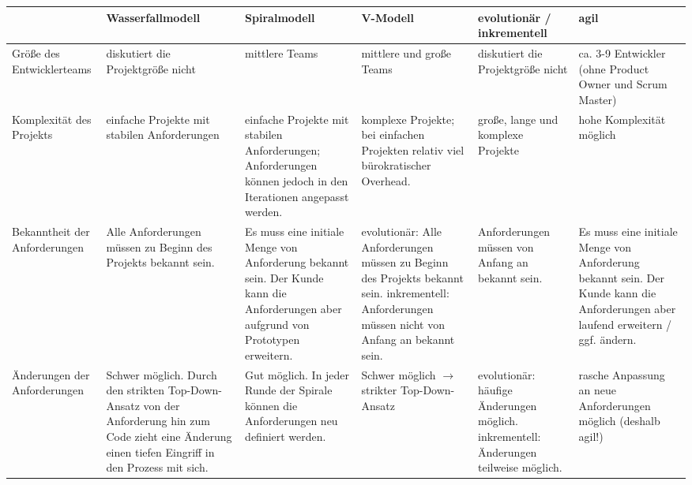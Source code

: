 \documentclass{bschlangaul-aufgabe}
\begin{document}
\begin{liAntwort}
\noindent
{\tiny
\begin{tabularx}{\linewidth}{>{\raggedright\arraybackslash}X||>{\raggedright\arraybackslash}X>{\raggedright\arraybackslash}X>{\raggedright\arraybackslash}X>{\raggedright\arraybackslash}X>{\raggedright\arraybackslash}X}
&
Wasserfallmodell &
Spiralmodell &
V-Modell &
evolutionär / inkrementell &
agil
\\\hline\hline

Größe des Entwicklerteams &
diskutiert die Projektgröße nicht & %
mittlere Teams & %
mittlere und große Teams & %
diskutiert die Projektgröße nicht & %
ca. 3-9 Entwickler (ohne Product Owner und Scrum Master) %
\\\hline

Komplexität des Projekts &
einfache Projekte mit stabilen Anforderungen & %
einfache Projekte mit stabilen Anforderungen; Anforderungen können
jedoch in den Iterationen angepasst werden. & %
komplexe Projekte; bei einfachen Projekten relativ viel bürokratischer
Overhead. & %
große, lange und komplexe Projekte & %
hohe Komplexität möglich %
\\\hline

Bekanntheit der Anforderungen &
Alle Anforderungen müssen zu Beginn des Projekts bekannt sein.
& %
Es muss eine initiale Menge von Anforderung bekannt sein. Der Kunde
kann die Anforderungen aber aufgrund von Prototypen erweitern.
& %
evolutionär: Alle Anforderungen müssen zu Beginn des Projekts bekannt
sein. inkrementell: Anforderungen müssen nicht von Anfang an bekannt
sein. & %
Anforderungen müssen von Anfang an bekannt sein.
& %
Es muss eine initiale Menge von Anforderung bekannt sein. Der Kunde
kann die Anforderungen aber laufend erweitern / ggf. ändern. %
\\\hline

Änderungen der Anforderungen &
Schwer möglich. Durch den strikten Top-Down-Ansatz von der Anforderung
hin zum Code zieht eine Änderung einen tiefen Eingriff in den
Prozess mit sich. & %
Gut möglich. In jeder Runde der Spirale können die Anforderungen neu
definiert werden. & %
Schwer möglich $\rightarrow$ strikter Top-Down-Ansatz & %
evolutionär: häufige Änderungen möglich. inkrementell: Änderungen
teilweise möglich. & %
rasche Anpassung an neue Anforderungen möglich (deshalb agil!) %
\\\hline


\end{tabularx}}
\end{liAntwort}
\end{document}
